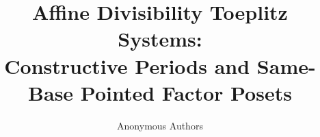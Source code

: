 \documentclass[a4paper,11pt]{article}
\title{Affine Divisibility Toeplitz Systems:\\
Constructive Periods and Same-Base Pointed Factor Posets}
\author{Anonymous Authors}
\date{}
\theoremstyle{definition}
\begin{document}
\maketitle

\begin{abstract}

\end{abstract}













\clearpage
\appendix


\end{document}
